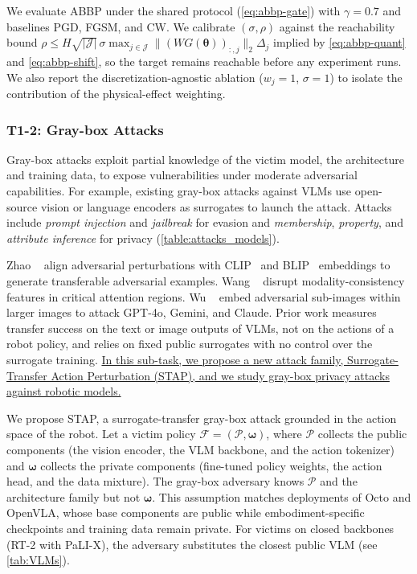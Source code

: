  We evaluate ABBP under the shared protocol (\autoref{eq:abbp-gate}) with $\gamma{=}0.7$ and baselines PGD, FGSM, and CW. We calibrate $(\sigma,\rho)$ against the reachability bound $\rho\le H\sqrt{|\mathcal{J}|}\,\sigma\max_{j\in\mathcal{J}}\|(WG(\bm{\theta}))_{:,j}\|_{2}\Delta_{j}$ implied by \autoref{eq:abbp-quant} and \autoref{eq:abbp-shift}, so the target remains reachable before any experiment runs. We also report the discretization-agnostic ablation ($w_j{=}1$, $\sigma{=}1$) to isolate the contribution of the physical-effect weighting.


\subsubsection{T1-2: Gray-box Attacks} \label{sec:t1_2}
Gray-box attacks exploit partial knowledge of the victim model, \eg the architecture and training data, to expose vulnerabilities under moderate adversarial capabilities. For example, existing gray-box attacks against VLMs use open-source vision or language encoders as surrogates to launch the attack.
Attacks include \emph{prompt injection} and \emph{jailbreak} for evasion and \emph{membership}, \emph{property}, and \emph{attribute inference} for privacy (\autoref{table:attacks_models}).

 Zhao \etal~\cite{zhao2024evaluating} align adversarial perturbations with CLIP~\cite{radford2021learning} and BLIP~\cite{li2022blip} embeddings to generate transferable adversarial examples. Wang \etal~\cite{wang2024transferable} disrupt modality-consistency features in critical attention regions. Wu \etal~\cite{wu2024adversarial} embed adversarial sub-images within larger images to attack GPT-4o, Gemini, and Claude. Prior work measures transfer success on the text or image outputs of VLMs, not on the actions of a robot policy, and relies on fixed public surrogates with no control over the surrogate training.
\ul{In this sub-task, we propose a new attack family, Surrogate-Transfer Action Perturbation (STAP), and we study gray-box privacy attacks against robotic models.}

 We propose STAP, a surrogate-transfer gray-box attack grounded in the action space of the robot. Let a victim policy  $\mathcal{F}=(\mathcal{P},\bm{\omega})$, where $\mathcal{P}$ collects the public components (\eg the vision encoder, the VLM backbone, and the action tokenizer) and $\bm{\omega}$ collects the private components (\eg fine-tuned policy weights, the action head, and the data mixture). The gray-box adversary knows $\mathcal{P}$ and the architecture family but not $\bm{\omega}$. 
This assumption matches deployments of Octo and OpenVLA, whose base components are public while embodiment-specific checkpoints and training data remain private. For victims on closed backbones (\eg RT-2 with PaLI-X), the adversary substitutes the closest public VLM (see \autoref{tab:VLMs}). %

